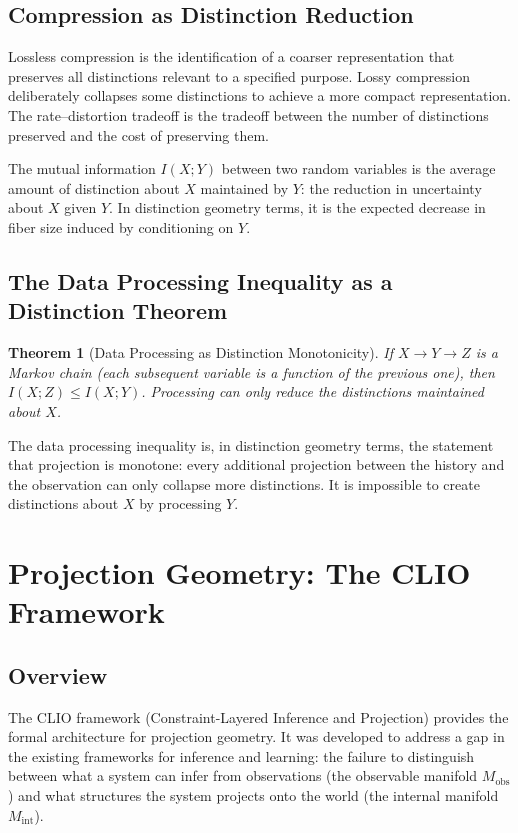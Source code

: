 \documentclass[12pt,a4paper]{book}
\newtheorem{theorem}{Theorem}[chapter]
\theoremstyle{remark}
\theoremstyle{definition}
\begin{document}
\section{Compression as Distinction Reduction}

Lossless compression is the identification of a coarser representation
that preserves all distinctions relevant to a specified purpose. Lossy
compression deliberately collapses some distinctions to achieve a more
compact representation. The rate--distortion tradeoff is the tradeoff
between the number of distinctions preserved and the cost of preserving them.

The mutual information $I(X; Y)$ between two random variables is the
average amount of distinction about $X$ maintained by $Y$: the reduction
in uncertainty about $X$ given $Y$. In distinction geometry terms, it is
the expected decrease in fiber size induced by conditioning on $Y$.

\section{The Data Processing Inequality as a Distinction Theorem}

\begin{theorem}[Data Processing as Distinction Monotonicity]
If $X \to Y \to Z$ is a Markov chain (each subsequent variable is
a function of the previous one), then $I(X;Z) \leq I(X;Y)$. Processing
can only reduce the distinctions maintained about $X$.
\end{theorem}

The data processing inequality is, in distinction geometry terms, the
statement that projection is monotone: every additional projection
between the history and the observation can only collapse more
distinctions. It is impossible to create distinctions about $X$ by
processing $Y$.

\chapter{Projection Geometry: The CLIO Framework}

\section{Overview}

The CLIO framework (Constraint-Layered Inference and Projection) provides
the formal architecture for projection geometry. It was developed to
address a gap in the existing frameworks for inference and learning: the
failure to distinguish between what a system can infer from observations
(the observable manifold $M_{\mathrm{obs}}$) and what structures the
system projects onto the world (the internal manifold $M_{\mathrm{int}}$).
\end{document}
